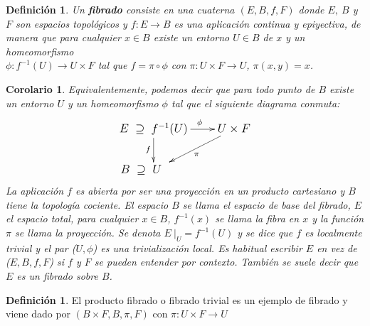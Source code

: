 \documentclass[12pt,twoside]{report}
\theoremstyle{azul}
\newtheorem*{defix}{Definición}
\newtheorem*{corx}{Corolario}
\theoremstyle{azul2}
\theoremstyle{plain}
\theoremstyle{definition}
\newtheorem*{defi}{Definición}
\theoremstyle{remark}
\begin{document}
\begin{defix}  
Un \textbf{fibrado} consiste en una cuaterna $ (E,B,f ,F)$ donde $E, \: B$ y $F$ son espacios topológicos y $f: E \longrightarrow B$ es una aplicación continua y epiyectiva, de manera que para cualquier $x \in B$ existe un entorno $U \in B$ de $x$ y un homeomorfismo \\ $\phi : f^{-1}(U) \longrightarrow U \times F$ tal que  $f =\pi \circ \phi$  con $\pi : U\times F\longrightarrow U$, $\pi(x,y)=x$. 
\end{defix}
\begin{corx}
Equivalentemente, podemos decir que para todo punto de $B$ existe un entorno $U$ y un homeomorfismo $\phi$  tal que el siguiente diagrama conmuta: 
$$\mathlarger{\xymatrix{
E \; \supseteq \; f^{-1}(U) \ar[r]^{\quad \phi} \ar[d]_{f} & U \times F \ar[ld]^{\pi} \\
B \; \supseteq \; U \quad \; \; \; \;& 
}} $$
La aplicación $f$  es abierta por ser una proyección en un producto cartesiano y $B$ tiene la topología cociente. El espacio $B$ se llama el espacio de base del fibrado, $E$ el espacio total, para cualquier $x \in B$, $f^{-1}(x)$ se llama la fibra en $x$ y la función $\pi$ se llama la proyección. Se denota $E \: |_{U}= f^{-1}(U)$ y se dice que $f$ es localmente trivial y el par ($U,\phi$) es una trivialización local. Es habitual escribir $E$ en vez de ($E,B,f ,F$) si $f$ y $F$ se pueden entender por contexto. Tambi{\'e}n se suele decir que $E$ es un fibrado sobre $B$.
\end{corx}
\begin{defi} El producto fibrado o fibrado trivial es un ejemplo de fibrado y viene dado por $(B \times F, B, \pi, F)$ con $\pi : U \times F \longrightarrow U $
\end{defi}
\end{document}
